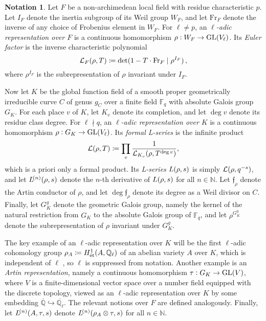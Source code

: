 \documentclass{article}
\theoremstyle{definition}
\theoremstyle{definition}
\newtheorem{notation}[n]{Notation}
\newcommand{\et}{\text{\'et}}
\newcommand{\FF}{\mathbb{F}}
\newcommand{\ffff}{\mathfrak{f}}
\newcommand{\Fr}{\mathrm{Fr}}
\newcommand{\GL}{\mathrm{GL}}
\newcommand{\LLL}{\mathcal{L}}
\newcommand{\NN}{\mathbb{N}}
\newcommand{\QQ}{\mathbb{Q}}
\newcommand{\st}{\mid}
\newcommand{\br}{\!\del[0]}
\begin{document}
\pagebreak

\begin{notation}
Let $ F $ be a non-archimedean local field with residue characteristic $ p $. Let $ I_F $ denote the inertia subgroup of its Weil group $ W_F $, and let $ \Fr_F $ denote the inverse of any choice of Frobenius element in $ W_F $. For $ \ell \ne p $, an \emph{$ \ell $-adic representation over $ F $} is a continuous homomorphism $ \rho : W_F \to \GL\br{V_\ell} $. Its \emph{Euler factor} is the inverse characteristic polynomial
$$ \LLL_F\br{\rho, T} \coloneqq \det\br{1 - T \cdot \Fr_F \st \rho^{I_F}}, $$
where $ \rho^{I_F} $ is the subrepresentation of $ \rho $ invariant under $ I_F $.

Now let $ K $ be the global function field of a smooth proper geometrically irreducible curve $ C $ of genus $ g_C $ over a finite field $ \FF_q $ with absolute Galois group $ G_K $. For each place $ v $ of $ K $, let $ K_v $ denote its completion, and let $ \deg v $ denote its residue class degree. For $ \ell \nmid q $, an \emph{$ \ell $-adic representation over $ K $} is a continuous homomorphism $ \rho : G_K \to \GL\br{V_\ell} $. Its \emph{formal L-series} is the infinite product
$$ \LLL\br{\rho, T} \coloneqq \prod_v \dfrac{1}{\LLL_{K_v}\br{\rho, T^{\deg v}}}, $$
which is a priori only a formal product. Its \emph{L-series} $ L\br{\rho, s} $ is simply $ \LLL\br{\rho, q^{-s}} $, and let $ L^{\br{n}}\br{\rho, s} $ denote the $ n $-th derivative of $ L\br{\rho, s} $ for all $ n \in \NN $. Let $ \ffff_\rho $ denote the Artin conductor of $ \rho $, and let $ \deg\ffff_\rho $ denote its degree as a Weil divisor on $ C $. Finally, let $ G_K^g $ denote the geometric Galois group, namely the kernel of the natural restriction from $ G_K $ to the absolute Galois group of $ \FF_q $, and let $ \rho^{G_K^g} $ denote the subrepresentation of $ \rho $ invariant under $ G_K^g $.

The key example of an $ \ell $-adic representation over $ K $ will be the first $ \ell $-adic cohomology group $ \rho_A \coloneqq H_\et^1\br{A, \QQ_\ell} $ of an abelian variety $ A $ over $ K $, which is independent of $ \ell $ \cite[Theorem 4.3]{GR72}, so $ \ell $ is suppressed from notation. Another example is an \emph{Artin representation}, namely a continuous homomorphism $ \tau : G_K \to \GL\br{V} $, where $ V $ is a finite-dimensional vector space over a number field equipped with the discrete topology, viewed as an $ \ell $-adic representation over $ K $ by some embedding $ \overline{\QQ} \hookrightarrow \overline{\QQ_\ell} $. The relevant notions over $ F $ are defined analogously. Finally, let $ L^{\br{n}}\br{A, \tau, s} $ denote $ L^{\br{n}}\br{\rho_A \otimes \tau, s} $ for all $ n \in \NN $.


\end{notation}
\end{document}
